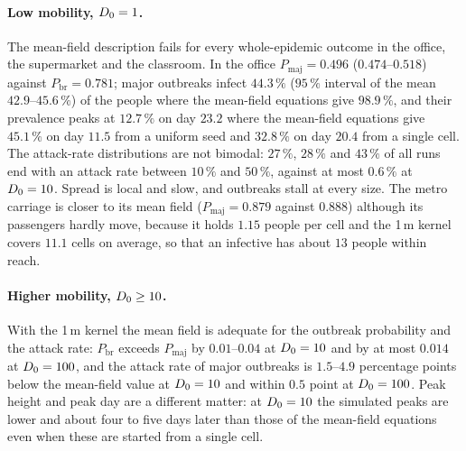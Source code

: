 \paragraph{Low mobility, $D_0=1$.} The mean-field description fails for every whole-epidemic outcome in the
office, the supermarket and the classroom. In the office $P_{\mathrm{maj}}=0.496$ ($0.474$--$0.518$) against
$P_{\mathrm{br}}=0.781$; major outbreaks infect $44.3\,\%$ ($95\,\%$ interval of the mean $42.9$--$45.6\,\%$) of
the people where the mean-field equations give
$98.9\,\%$, and their prevalence peaks at $12.7\,\%$ on day $23.2$ where the mean-field equations give $45.1\,\%$
on day $11.5$ from a uniform seed and $32.8\,\%$ on day $20.4$ from a single cell. The attack-rate distributions
are not bimodal: $27\,\%$, $28\,\%$ and $43\,\%$ of all runs end with an attack rate between $10\,\%$ and
$50\,\%$, against at most $0.6\,\%$ at $D_0=10$. Spread is local and slow, and outbreaks stall at every size.
The metro carriage is closer to its mean field ($P_{\mathrm{maj}}=0.879$ against $0.888$) although its
passengers hardly move, because it holds $1.15$ people per cell and the 1\,m kernel covers $11.1$ cells on
average, so that an infective has about $13$ people within reach.

\paragraph{Higher mobility, $D_0\ge10$.} With the 1\,m kernel the mean field is adequate for the outbreak
probability and the attack rate: $P_{\mathrm{br}}$ exceeds $P_{\mathrm{maj}}$ by $0.01$--$0.04$ at $D_0=10$ and
by at most $0.014$ at $D_0=100$, and the attack rate of major outbreaks is $1.5$--$4.9$ percentage points below
the mean-field value at $D_0=10$ and within $0.5$ point at $D_0=100$. Peak height and peak day are a different
matter: at $D_0=10$ the simulated peaks are lower and about four to five days later than those of the mean-field
equations even when these are started from a single cell.

